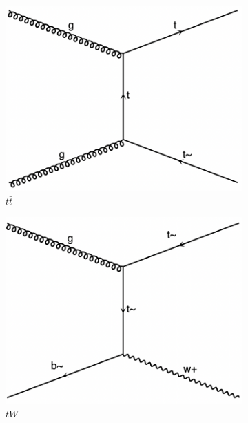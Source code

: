 \documentclass[NOTE, REPORT=true, atlasdraft=true, USenglish]{atlasdoc}
\begin{document}
\begin{figure}[htp]
\centering
\begin{minipage}{\linewidth}
\begin{subfigure}[t]{0.3\textwidth}
\includegraphics[width=\textwidth]{plots/ttbar.png}
\caption{$t\bar{t}$} \label{fig:ttbar}
\end{subfigure}
\begin{subfigure}[t]{0.3\textwidth}
\includegraphics[width=\textwidth]{plots/tW.png}
\caption{$tW$} \label{fig:tW}
\end{subfigure}
\begin{subfigure}[t]{0.3\linewidth}

\end{subfigure}
\end{minipage}
\end{figure}
\end{document}
